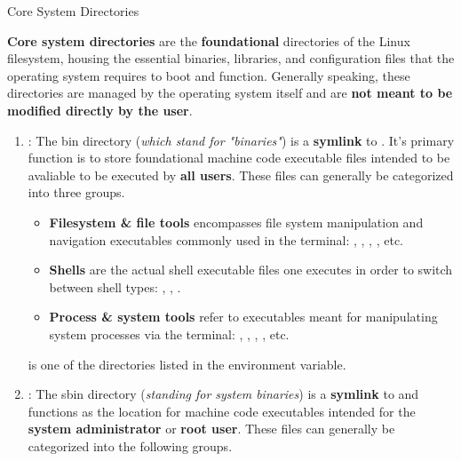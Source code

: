 \documentclass[10pt]{article}
\begin{document}
    \begin{core}[label=core:coresd]{Core System Directories}

      \textbf{Core system directories} are the \textbf{foundational} directories of the Linux filesystem, housing the essential binaries, libraries, and configuration files that the operating system requires to boot and function. Generally speaking, these directories are managed by the operating system itself and are \textbf{not meant to be modified directly by the user}.

      \begin{enumerate}

        \item {} : The bin directory (\textit{which stand for "binaries"}) is a \textbf{symlink} to . It's primary function is to store foundational machine code executable files intended to be avaliable to be executed by \textbf{all users}. These files can generally be categorized into three groups.

          \begin{itemize}

            \item \textbf{Filesystem \& file tools} encompasses file system manipulation and navigation executables commonly used in the terminal: , , , , etc.

            \item \textbf{Shells} are the actual shell executable files one executes in order to switch between shell types: , , .

            \item \textbf{Process \& system tools} refer to executables meant for manipulating system processes via the terminal: , , , , etc.

          \end{itemize}

         is one of the directories listed in the  environment variable.

        \item {} : The sbin directory (\textit{standing for system binaries}) is a \textbf{symlink} to  and functions as the location for machine code executables intended for the \textbf{system administrator} or \textbf{root user}. These files can generally be categorized into the following groups.


\end{enumerate}
\end{core}
\end{document}
